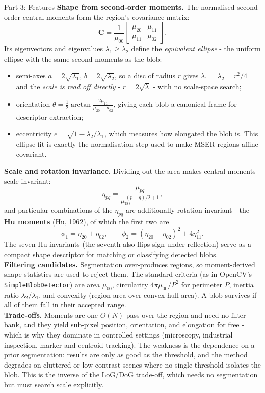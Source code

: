 \documentclass[letterpaper]{article}
\begin{document}
\begin{notes}{Part 3: Features}
\textbf{Shape from second-order moments.} The normalised second-order central moments form the region's covariance matrix:
$$\mathbf{C} = \frac{1}{\mu_{00}}\begin{bmatrix} \mu_{20} & \mu_{11} \\ \mu_{11} & \mu_{02} \end{bmatrix}.$$
Its eigenvectors and eigenvalues $\lambda_1 \ge \lambda_2$ define the \emph{equivalent ellipse} - the uniform ellipse with the same second moments as the blob:
\begin{itemize}
    \item semi-axes $a = 2\sqrt{\lambda_1}$, $b = 2\sqrt{\lambda_2}$, so a disc of radius $r$ gives $\lambda_1=\lambda_2=r^2/4$ and the \emph{scale is read off directly} - $r = 2\sqrt{\lambda}$ - with no scale-space search;
    \item orientation $\displaystyle \theta = \tfrac{1}{2}\arctan\frac{2\mu_{11}}{\mu_{20}-\mu_{02}}$, giving each blob a canonical frame for descriptor extraction;
    \item eccentricity $e = \sqrt{1 - \lambda_2/\lambda_1}$, which measures how elongated the blob is. This ellipse fit is exactly the normalisation step used to make MSER regions affine covariant.
\end{itemize}

\textbf{Scale and rotation invariance.} Dividing out the area makes central moments scale invariant:
$$\eta_{pq} = \frac{\mu_{pq}}{\mu_{00}^{\,(p+q)/2 + 1}},$$
and particular combinations of the $\eta_{pq}$ are additionally rotation invariant - the \textbf{Hu moments} (Hu, 1962), of which the first two are
$$\phi_1 = \eta_{20}+\eta_{02}, \qquad \phi_2 = (\eta_{20}-\eta_{02})^2 + 4\eta_{11}^2.$$
The seven Hu invariants (the seventh also flips sign under reflection) serve as a compact shape descriptor for matching or classifying detected blobs.\\

\textbf{Filtering candidates.} Segmentation over-produces regions, so moment-derived shape statistics are used to reject them. The standard criteria (as in OpenCV's \texttt{SimpleBlobDetector}) are area $\mu_{00}$, circularity $4\pi\mu_{00}/P^2$ for perimeter $P$, inertia ratio $\lambda_2/\lambda_1$, and convexity (region area over convex-hull area). A blob survives if all of them fall in their accepted range.\\

\textbf{Trade-offs.} Moments are one $O(N)$ pass over the region and need no filter bank, and they yield sub-pixel position, orientation, and elongation for free - which is why they dominate in controlled settings (microscopy, industrial inspection, marker and centroid tracking). The weakness is the dependence on a prior segmentation: results are only as good as the threshold, and the method degrades on cluttered or low-contrast scenes where no single threshold isolates the blob. This is the inverse of the LoG/DoG trade-off, which needs no segmentation but must search scale explicitly.


\end{notes}
\end{document}
